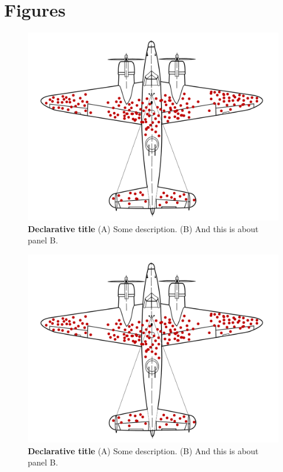 \pagebreak

\section*{Figures}
\begin{figure}[h!]
    \centering
    \includegraphics[width=1\linewidth]{figures/fig1.pdf}
    \caption{\textbf{Declarative title} (A) Some description. (B) And this is about panel B.}
    \label{fig:fig1}
  \end{figure}

\begin{figure}[h!]
    \centering
    \includegraphics[width=1\linewidth]{figures/fig2.pdf}
    \caption{\textbf{Declarative title} (A) Some description. (B) And this is about panel B.}
    \label{fig:fig2}
  \end{figure}

